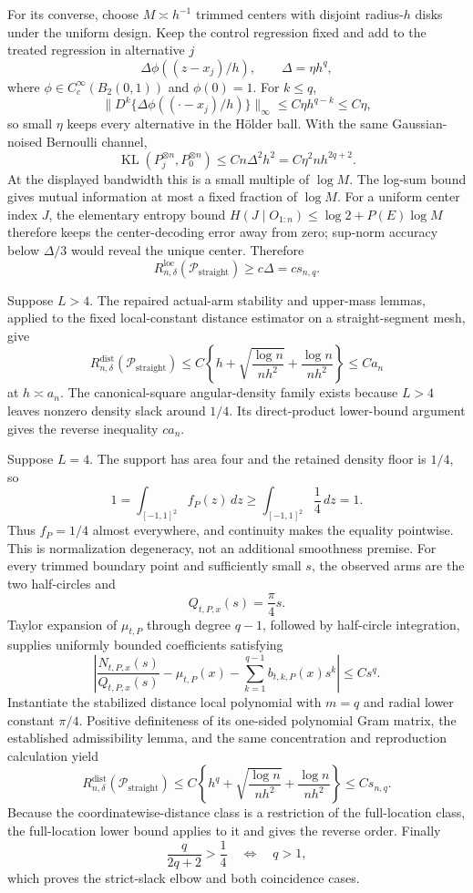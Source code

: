 For its converse, choose \(M\asymp h^{-1}\) trimmed centers with disjoint
radius-\(h\) disks under the uniform design.  Keep the control regression fixed
and add to the treated regression in alternative \(j\)
\[
 \Delta\phi((z-x_j)/h),\qquad \Delta=\eta h^q,
\]
where \(\phi\in C_c^\infty(B_2(0,1))\) and \(\phi(0)=1\).  For \(k\leq q\),
\[
 \lVert D^k\{\Delta\phi((\cdot-x_j)/h)\}\rVert_\infty
 \leq C\eta h^{q-k}\leq C\eta,
\]
so small \(\eta\) keeps every alternative in the H\"older ball.  With the
same Gaussian-noised Bernoulli channel,
\[
 \operatorname{KL}(P_j^{\otimes n},P_0^{\otimes n})
 \leq Cn\Delta^2h^2=C\eta^2nh^{2q+2}.
\]
At the displayed bandwidth this is a small multiple of \(\log M\).  The
log-sum bound gives mutual information at most a fixed fraction of \(\log M\).
For a uniform center index \(J\), the elementary entropy bound
\(H(J\mid O_{1:n})\leq\log2+P(E)\log M\) therefore keeps the
center-decoding error away from zero; sup-norm accuracy below \(\Delta/3\)
would reveal the unique center.
Therefore
\[
 R_{n,\delta}^{\mathrm{loc}}(\mathcal P_{\mathrm{straight}})
 \geq c\Delta=cs_{n,q}.
\]

Suppose \(L>4\).  The repaired actual-arm stability and upper-mass lemmas,
applied to the fixed local-constant distance estimator on a straight-segment
mesh, give
\[
 R_{n,\delta}^{\mathrm{dist}}(\mathcal P_{\mathrm{straight}})
 \leq C\left\{h+\sqrt{\frac{\log n}{nh^2}}
 +\frac{\log n}{nh^2}\right\}\leq Ca_n
\]
at \(h\asymp a_n\).  The canonical-square angular-density family exists
because \(L>4\) leaves nonzero density slack around \(1/4\).  Its direct-product
lower-bound argument gives the reverse inequality \(ca_n\).

Suppose \(L=4\).  The support has area four and the retained density floor is
\(1/4\), so
\[
 1=\int_{[-1,1]^2}f_P(z)\,dz
 \geq\int_{[-1,1]^2}\frac14\,dz=1.
\]
Thus \(f_P=1/4\) almost everywhere, and continuity makes the equality
pointwise.  This is normalization degeneracy, not an additional smoothness
premise.  For every trimmed boundary point and sufficiently small \(s\), the
observed arms are the two half-circles and
\[
 Q_{t,P,x}(s)=\frac\pi4s.
\]
Taylor expansion of \(\mu_{t,P}\) through degree \(q-1\), followed by
half-circle integration, supplies uniformly bounded coefficients satisfying
\[
 \left|\frac{N_{t,P,x}(s)}{Q_{t,P,x}(s)}-\mu_{t,P}(x)
 -\sum_{k=1}^{q-1}b_{t,k,P}(x)s^k\right|\leq Cs^q.
\]
Instantiate the stabilized distance local polynomial with \(m=q\) and radial
lower constant \(\pi/4\).  Positive definiteness of its one-sided polynomial
Gram matrix, the established admissibility lemma, and the same concentration
and reproduction calculation yield
\[
 R_{n,\delta}^{\mathrm{dist}}(\mathcal P_{\mathrm{straight}})
 \leq C\left\{h^q+\sqrt{\frac{\log n}{nh^2}}+
 \frac{\log n}{nh^2}\right\}\leq Cs_{n,q}.
\]
Because the coordinatewise-distance class is a restriction of the full-location
class, the full-location lower bound applies to it and gives the reverse order.
Finally
\[
 \frac{q}{2q+2}>\frac14\quad\Longleftrightarrow\quad q>1,
\]
which proves the strict-slack elbow and both coincidence cases.